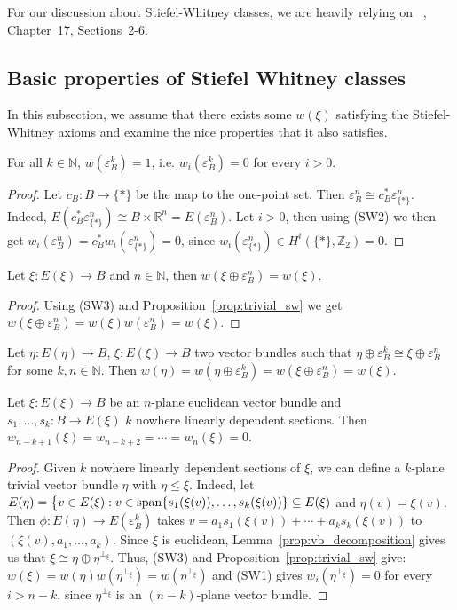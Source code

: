 For our discussion about Stiefel-Whitney classes, we are heavily relying on ~\cite{husemoller}, Chapter~17, Sections~2-6.

\subsection{Basic properties of Stiefel Whitney classes}
In this subsection, we assume that there exists some $w(\xi)$ satisfying the Stiefel-Whitney axioms and examine the nice properties that it also satisfies.
\begin{proposition}\label{prop:trivial_sw} For all $k\in\mathbb{N}$, $w(\varepsilon_B^k)=1$, i.e. $w_i(\varepsilon_B^k)=0$ for every $i>0$.
\end{proposition}
\begin{proof} Let $c_B:B\to\{*\}$ be the map to the one-point set. Then $\varepsilon_B^n\cong c_B^*\varepsilon_{\{*\}}^n$. Indeed, $E(c_B^*\varepsilon_{\{*\}}^n)\cong B\times\mathbb{R}^n=E(\varepsilon_B^n)$. Let $i>0$, then using (SW2) we then get $w_i(\varepsilon_B^n)=c_B^*w_i(\varepsilon_{\{*\}}^n)=0$, since $w_i(\varepsilon_{\{*\}}^n)\in H^i(\{*\},\mathbb{Z}_2)=0$.
\end{proof}

\begin{proposition} Let $\xi:E(\xi)\to B$ and $n\in\mathbb{N}$, then $w(\xi\oplus\varepsilon_B^n)=w(\xi)$.
\end{proposition}
\begin{proof} Using (SW3) and Proposition~\ref{prop:trivial_sw} we get $w(\xi\oplus\varepsilon_B^n)=w(\xi)w(\varepsilon_B^n)=w(\xi)$.
\end{proof}

\begin{corollary} Let $\eta:E(\eta)\to B$, $\xi:E(\xi)\to B$ two vector bundles such that $\eta\oplus\varepsilon_B^k\cong\xi\oplus\varepsilon_B^n$ for some $k,n\in\mathbb{N}$. Then $w(\eta)=w(\eta\oplus\varepsilon_B^k)=w(\xi\oplus\varepsilon_B^n)=w(\xi)$.
\end{corollary}

\begin{proposition} Let $\xi:E(\xi)\to B$ be an $n$-plane euclidean vector bundle and $s_1,\ldots,s_k:B\to E(\xi)$ $k$ nowhere linearly dependent sections. Then $w_{n-k+1}(\xi)=w_{n-k+2}=\cdots=w_n(\xi)=0$.
\end{proposition}
\begin{proof} Given $k$ nowhere linearly dependent sections of $\xi$, we can define a $k$-plane trivial vector bundle $\eta$ with $\eta\leq\xi$. Indeed, let $E(\eta)=\big\{v\in E(\xi):v\in\mathrm{span}\{s_1(\xi(v)),\ldots,s_k(\xi(v))\}\subseteq E(\xi)$ and $\eta(v)=\xi(v)$. Then $\phi:E(\eta)\to E(\varepsilon_B^k)$ takes $v=a_1s_1(\xi(v))+\cdots+a_ks_k(\xi(v))$ to $(\xi(v),a_1,\ldots,a_k)$. Since $\xi$ is euclidean, Lemma~\ref{prop:vb_decomposition} gives us that $\xi\cong\eta\oplus\eta^{\perp_{\xi}}$. Thus, (SW3) and Proposition~\ref{prop:trivial_sw} give: $w(\xi)=w(\eta)w(\eta^{\perp_{\xi}})=w(\eta^{\perp_{\xi}})$ and (SW1) gives $w_i(\eta^{\perp_{\xi}})=0$ for every $i>n-k$, since $\eta^{\perp_{\xi}}$ is an $(n-k)$-plane vector bundle.
\end{proof}

